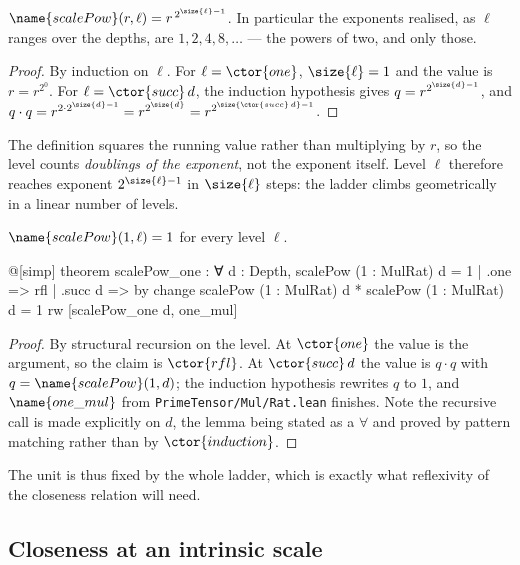 \begin{proposition}\label{Scale:prop:exponent}
$\name{scalePow}(r, \ell) = r^{\,2^{\size{\ell} - 1}}$.  In particular the
exponents realised, as $\ell$ ranges over the depths, are
$1, 2, 4, 8, \dots$ --- the powers of two, and only those.
\end{proposition}

\begin{proof}
By induction on $\ell$.  For $\ell = \ctor{one}$, $\size{\ell} = 1$ and the
value is $r = r^{2^0}$.  For $\ell = \ctor{succ}\,d$, the induction hypothesis
gives $q = r^{2^{\size{d}-1}}$, and $q \cdot q = r^{2 \cdot 2^{\size{d}-1}}
= r^{2^{\size{d}}} = r^{2^{\size{\ctor{succ}\,d} - 1}}$.
\end{proof}

The definition squares the running value rather than multiplying by $r$, so
the level counts \emph{doublings of the exponent}, not the exponent itself.
Level $\ell$ therefore reaches exponent $2^{\size{\ell}-1}$ in $\size{\ell}$
steps: the ladder climbs geometrically in a linear number of levels.

\begin{lemma}\label{Scale:lem:scalepow-one}
$\name{scalePow}(1, \ell) = 1$ for every level $\ell$.
\end{lemma}

\begin{leancode}
@[simp] theorem scalePow_one : ∀ d : Depth, scalePow (1 : MulRat) d = 1
  | .one => rfl
  | .succ d => by
      change scalePow (1 : MulRat) d * scalePow (1 : MulRat) d = 1
      rw [scalePow_one d, one_mul]
\end{leancode}

\begin{proof}
By structural recursion on the level.  At $\ctor{one}$ the value is the
argument, so the claim is $\ctor{rfl}$.  At $\ctor{succ}\,d$ the value is
$q \cdot q$ with $q = \name{scalePow}(1, d)$; the induction hypothesis rewrites
$q$ to $1$, and $\name{one\_mul}$ from \texttt{PrimeTensor/Mul/Rat.lean}
finishes.  Note the recursive call is made explicitly on $d$, the lemma being
stated as a $\forall$ and proved by pattern matching rather than by
$\ctor{induction}$.
\end{proof}

The unit is thus fixed by the whole ladder, which is exactly what reflexivity
of the closeness relation will need.

\subsection{Closeness at an intrinsic scale}

